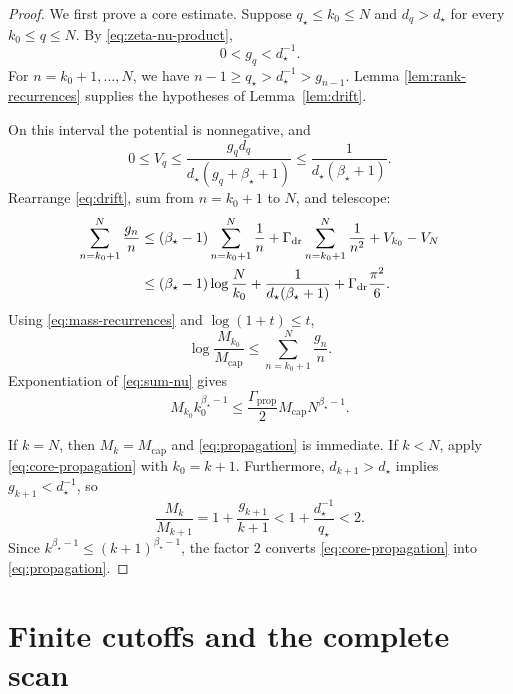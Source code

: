 \documentclass[11pt]{article}
\theoremstyle{definition}
\theoremstyle{remark}
\newcommand{\rankmass}{M}
\newcommand{\rankdens}{d}
\newcommand{\rankgain}{g}
\newcommand{\criticalexp}{\beta_{\star}}
\newcommand{\threshold}{d_{\star}}
\newcommand{\rankcut}{q_{\star}}
\newcommand{\propconst}{\Gamma_{\mathrm{prop}}}
\begin{document}
\begin{proof}
We first prove a core estimate.  Suppose \(\rankcut\le k_0\le N\) and
\(\rankdens_q>\threshold\) for every \(k_0\le q\le N\).  By
\eqref{eq:zeta-nu-product},
\[
 0<\rankgain_q<\threshold^{-1}.
\]
For \(n=k_0+1,\ldots,N\), we have
\(n-1\ge\rankcut>\threshold^{-1}>\rankgain_{n-1}\).  Lemma
\ref{lem:rank-recurrences} supplies the hypotheses of
Lemma~\ref{lem:drift}.

On this interval the potential is nonnegative, and
\begin{equation}
 0\le V_q
 \le
 \frac{\rankgain_q\rankdens_q}
      {\threshold(\rankgain_q+\criticalexp+1)}
 \le\frac1{\threshold(\criticalexp+1)}.
 \label{eq:potential-bound}
\end{equation}
Rearrange \eqref{eq:drift}, sum from \(n=k_0+1\) to \(N\), and telescope:
\begin{equation}
\begin{aligned}
 \sum_{n=k_0+1}^N\frac{\rankgain_n}{n}
 &\le
 (\criticalexp-1)\sum_{n=k_0+1}^N\frac1n
 +\Gamma_{\rm dr}\sum_{n=k_0+1}^N\frac1{n^2}
 +V_{k_0}-V_N\\
 &\le
 (\criticalexp-1)\log\frac N{k_0}
 +\frac1{\threshold(\criticalexp+1)}
 +\Gamma_{\rm dr}\frac{\pi^2}{6}.
\end{aligned}
\label{eq:sum-nu}
\end{equation}
Using \eqref{eq:mass-recurrences} and \(\log(1+t)\le t\),
\[
 \log\frac{\rankmass_{k_0}}{\rankmass_{\mathrm{cap}}}
 \le\sum_{n=k_0+1}^N\frac{\rankgain_n}{n}.
\]
Exponentiation of \eqref{eq:sum-nu} gives
\begin{equation}
 \rankmass_{k_0}k_0^{\criticalexp-1}
 \le\frac{\propconst}{2}
       \rankmass_{\mathrm{cap}}N^{\criticalexp-1}.
 \label{eq:core-propagation}
\end{equation}

If \(k=N\), then \(\rankmass_k=\rankmass_{\mathrm{cap}}\) and
\eqref{eq:propagation} is immediate.
If \(k<N\), apply \eqref{eq:core-propagation} with \(k_0=k+1\).
Furthermore, \(\rankdens_{k+1}>\threshold\) implies
\(\rankgain_{k+1}<\threshold^{-1}\), so
\[
 \frac{\rankmass_k}{\rankmass_{k+1}}
 =1+\frac{\rankgain_{k+1}}{k+1}
 <1+\frac{\threshold^{-1}}{\rankcut}<2.
\]
Since \(k^{\criticalexp-1}\le(k+1)^{\criticalexp-1}\), the factor \(2\) converts
\eqref{eq:core-propagation} into \eqref{eq:propagation}.
\end{proof}

\section{Finite cutoffs and the complete scan}
\label{sec:scan}
\end{document}
